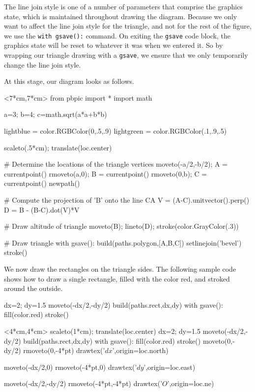 \documentclass[12pt]{article}
\def\code#1{{\tt #1}}
\begin{document}
The line join style is one of a number of parameters that comprise
the graphics state, which is maintained throughout drawing the diagram.
Because we only want to affect the line join style for the triangle, and
not for the rest of the figure, we use the \code{with gsave():} command.
On exiting the \code{gsave} code block, the graphics state will be reset to 
whatever it was when we entered it.  So by wrapping our triangle drawing
with a \code{gsave}, we ensure that we only temporarily change the
line join style.  

At this stage, our diagram looks as follows.

\hfil\begin{pbpic}<7*cm,7*cm>
from pbpic import *
import math

a=3; b=4; c=math.sqrt(a*a+b*b)

lightblue = color.RGBColor(0,.5,.9)
lightgreen = color.RGBColor(.1,.9,.5)

scaleto(.5*cm); translate(loc.center)

# Determine the locations of the triangle vertices
moveto(-a/2,-b/2); A = currentpoint()
rmoveto(a,0); B = currentpoint()
rmoveto(0,b); C = currentpoint()
newpath()

# Compute the projection of 'B' onto the line CA
V = (A-C).unitvector().perp()
D = B - (B-C).dot(V)*V

# Draw altitude of triangle
moveto(B); lineto(D);
stroke(color.GrayColor(.3))

# Draw triangle
with gsave():
  build(paths.polygon,[A,B,C])
  setlinejoin('bevel')
  stroke()
\end{pbpic}

We now draw the rectangles on the triangle sides.  The following
sample code shows how to draw a single rectangle, filled with
the color red, and stroked around the outside.
\begin{snippet}
dx=2; dy=1.5
moveto(-dx/2,-dy/2)
build(paths.rect,dx,dy)
with gsave():
  fill(color.red)
stroke()
\end{snippet}
\hfil\begin{pbpic}<4*cm,4*cm>
scaleto(1*cm); translate(loc.center)
dx=2; dy=1.5
moveto(-dx/2,-dy/2)
build(paths.rect,dx,dy)
with gsave():
  fill(color.red)
stroke()
moveto(0,-dy/2)
rmoveto(0,-4*pt)
drawtex('$dx$',origin=loc.north)

moveto(-dx/2,0)
rmoveto(-4*pt,0)
drawtex('$dy$',origin=loc.east)

moveto(-dx/2,-dy/2)
rmoveto(-4*pt,-4*pt)
drawtex('$O$',origin=loc.ne)
\end{pbpic}
\end{document}
